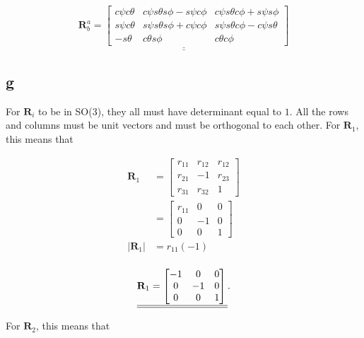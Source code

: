 \documentclass{article}
\begin{document}
\begin{equation*}
    \underline{\underline{\mathbf{R}_b^a = 
    \begin{bmatrix}
    c\psi c\theta  & c\psi s\theta s\phi - s\psi c\phi & c\psi s\theta c\phi + s\psi s\phi \\
    s\psi c\theta & s\psi s\theta s\phi + c\psi c\phi &   s\psi s\theta c\phi - c\psi s\theta \\
    - s\theta & c\theta s\phi & c\theta c\phi
    \end{bmatrix}}}
\end{equation*}

\subsection{g}

For $\mathbf{R}_i$ to be in SO(3), they all must have determinant  equal to $1$. All the rows and columns must be unit vectors and must be orthogonal to each other. 
For $\mathbf{R}_1$, this means that 

\begin{align*}
\mathbf{R}_1 &= 
    \begin{bmatrix}
    r_{11} & r_{12} & r_{12} \\
    r_{21} & -1 & r_{23} \\
    r_{31} & r_{32} & 1
    \end{bmatrix}\\
            &= 
    \begin{bmatrix}
    r_{11} & 0 & 0 \\
    0 & -1 & 0 \\
    0 & 0 & 1
    \end{bmatrix}\\
|\mathbf{R}_1| &= r_{11}(-1)\\
\end{align*}

\begin{equation*}
    \underline{\underline{\mathbf{R}_1 = \begin{bmatrix}
    -1 & 0 & 0 \\
    0 & -1 & 0 \\
    0 & 0 & 1
    \end{bmatrix}\\}}.
\end{equation*}

For $\mathbf{R}_2$, this means that 
\end{document}
